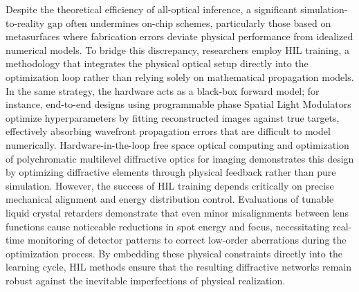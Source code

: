 Despite the theoretical efficiency of all-optical inference, a significant simulation-to-reality gap often undermines on-chip schemes, particularly those based on metasurfaces where fabrication errors deviate physical performance from idealized numerical models. To bridge this discrepancy, researchers employ HIL training, a methodology that integrates the physical optical setup directly into the optimization loop rather than relying solely on mathematical propagation models. In the same strategy, the hardware acts as a black-box forward model; for instance, end-to-end designs using programmable phase Spatial Light Modulators optimize hyperparameters by fitting reconstructed images against true targets, effectively absorbing wavefront propagation errors that are difficult to model numerically. Hardware-in-the-loop free space optical computing and optimization of polychromatic multilevel diffractive optics for imaging demonstrates this design by optimizing diffractive elements through physical feedback rather than pure simulation. \citep{doi_10_1109_icton67126_2025_11125227_383c0a4a} However, the success of HIL training depends critically on precise mechanical alignment and energy distribution control. Evaluations of tunable liquid crystal retarders demonstrate that even minor misalignments between lens functions cause noticeable reductions in spot energy and focus, necessitating real-time monitoring of detector patterns to correct low-order aberrations during the optimization process. By embedding these physical constraints directly into the learning cycle, HIL methods ensure that the resulting diffractive networks remain robust against the inevitable imperfections of physical realization. \citep{doi_10_1038_s41598_025_19638_8_1b2db1c9} \citep{doi_10_1364_oe_461549_b2d41b3f} \citep{doi_10_1021_acsphotonics_4c01284_s001_10346917}

